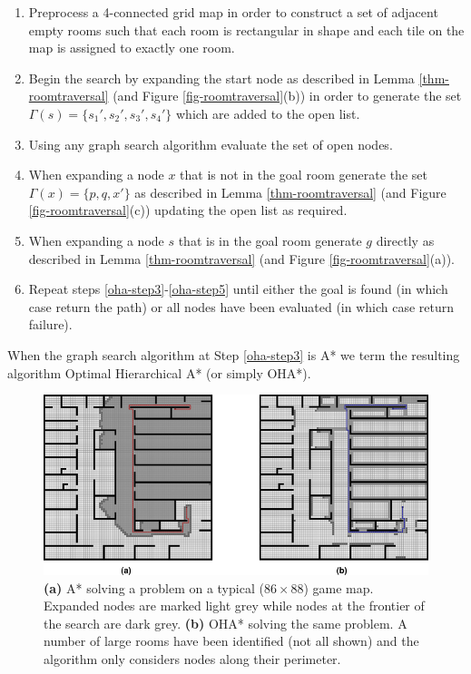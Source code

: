 \begin{enumerate}
\item{\label{oha-step1} Preprocess a 4-connected grid map in order to construct a set of adjacent empty rooms such that 
each room is rectangular in shape and each tile on the map is assigned to exactly one room. }
\item{\label{oha-step2} Begin the search by expanding the start node as described in 
Lemma \ref{thm-roomtraversal} (and Figure \ref{fig-roomtraversal}(b)) in order to generate the set 
$\Gamma(s) = \lbrace s_{1}', s_{2}', s_{3}', s_{4}'\rbrace$ which are added to the open list. }
\item{\label{oha-step3} Using any graph search algorithm evaluate the set of open nodes.}
\item{\label{oha-step4} When expanding a node $x$ that is not in the goal room generate the set 
$\Gamma(x) = \lbrace p, q, x' \rbrace$ as described in Lemma \ref{thm-roomtraversal} (and Figure
\ref{fig-roomtraversal}(c)) updating the open
list as required.} 
\item{\label{oha-step5} When expanding a node $s$ that is in the goal room generate $g$ directly as 
described in Lemma \ref{thm-roomtraversal} (and Figure \ref{fig-roomtraversal}(a)).} 
\item{Repeat steps \ref{oha-step3}-\ref{oha-step5} until either the goal is found (in which case return
the path) or all nodes have been evaluated (in which case return failure).}
\end{enumerate}
When the graph search algorithm at Step \ref{oha-step3} is A* we term the resulting algorithm 
Optimal Hierarchical A* (or simply OHA*).

\begin{figure}[htbp]
	\label{fig-oha_contrast}
	\vspace{-4pt}
       \begin{center}
           \includegraphics[scale=0.50, trim = 10mm 10mm 10mm 0mm]{diagrams/oha_contrast.png}
       \end{center}
	\vspace{-3pt}
       \caption{\textbf{(a)} A* solving a problem on a typical ($86\times88$) game map. 
Expanded nodes are marked light grey while nodes at the frontier of the search are dark grey.
\textbf{(b)} OHA* solving the same problem. A number of large rooms have been identified (not
all shown) and the algorithm only considers nodes along their perimeter.}
       \label{fig-ohacontrast}
	\vspace{-15pt}
\end{figure}


